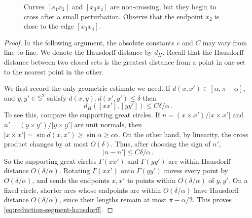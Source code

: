 \documentclass[reqno, 11pt]{amsart}
\theoremstyle{definition}
\newcommand{\abs}[1]{\left\lvert#1\right\rvert}
\begin{document}
\begin{figure}[t]
    \caption{Curves $[x_1x_2]$ and $[x_3x_4]$ are non-crossing, but they begin to cross after a small perturbation. Observe that the endpoint $x_2$ is close to the edge $[x_3x_4]$.}
    \label{fig:perturbation}
\end{figure}


\begin{proof}
In the following argument, the absolute constants $c$ and $C$ may vary from line to line. We denote the Hausdorff distance by $d_H$. Recall that the Hausdorff distance between two closed sets is the greatest distance from a point in one set to the nearest point in the other.

We first record the only geometric estimate we need. If \(d(x,x')\in[\alpha,\pi-\alpha]\), and  $y,y' \in {\mathbb S}^2$ satisfy \(d(x,y),d(x',y')\le\delta\) then
\begin{equation}\label{eq:reduction-segment-hausdorff}
        d_H([xx'],[yy'])\le C{\delta}/{\alpha}\,.
\end{equation}
To see this, compare the supporting great circles.  If
\(n=(x\times x')/\abs{x\times x'}\) and \(n'=(y\times y')/\abs{y\times y'}\) are unit normals, then \(\abs{x\times x'}=\sin d(x,x')\ge\sin\alpha\geq c\alpha\). On the other hand, by linearity, the cross product changes by at most \(O(\delta)\).  Thus, after choosing the sign of \(n'\),
\[
        \abs{n-n'}\le C{\delta}/{\alpha}\,.
\]
So the supporting great circles \(\Gamma(xx')\) and \(\Gamma(yy')\) are within Hausdorff distance \(O(\delta/\alpha)\).  Rotating \(\Gamma(xx')\) onto \(\Gamma(yy')\) moves every point by \(O(\delta/\alpha)\), and sends the endpoints \(x,x'\) to points within \(O(\delta/\alpha)\) of \(y,y'\).  On a fixed circle, shorter arcs whose endpoints are within \(O(\delta/\alpha)\) have Hausdorff distance \(O(\delta/\alpha)\), since their lengths remain at most \(\pi-\alpha/2\).  This proves \eqref{eq:reduction-segment-hausdorff}.


\end{proof}
\end{document}
